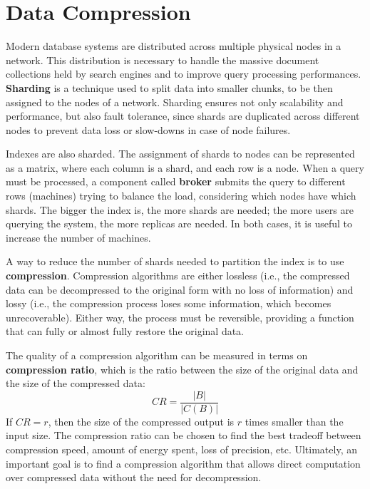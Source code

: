 \chapter{Data Compression}

Modern database systems are distributed across multiple physical nodes in a network. This distribution is necessary to handle the massive document collections held by search engines and to improve query processing performances. \textbf{Sharding} is a technique used to split data into smaller chunks, to be then assigned to the nodes of a network. Sharding ensures not only scalability and performance, but also fault tolerance, since shards are duplicated across different nodes to prevent data loss or slow-downs in case of node failures. 

Indexes are also sharded. The assignment of shards to nodes can be represented as a matrix, where each column is a shard, and each row is a node. When a query must be processed, a component called \textbf{broker} submits the query to different rows (machines) trying to balance the load, considering which nodes have which shards. The bigger the index is, the more shards are needed; the more users are querying the system, the more replicas are needed. In both cases, it is useful to increase the number of machines.

A way to reduce the number of shards needed to partition the index is to use \textbf{compression}. Compression algorithms are either lossless (i.e., the compressed data can be decompressed to the original form with no loss of information) and lossy (i.e., the compression process loses some information, which becomes unrecoverable). Either way, the process must be reversible, providing a function that can fully or almost fully restore the original data.

The quality of a compression algorithm can be measured in terms on \textbf{compression ratio}, which is the ratio between the size of the original data and the size of the compressed data:
\begin{equation*}
    \textit{CR} = \frac{|B|}{|C(B)|}
\end{equation*}
If $\textit{CR} = r$, then the size of the compressed output is $r$ times smaller than the input size. The compression ratio can be chosen to find the best tradeoff between compression speed, amount of energy spent, loss of precision, etc. Ultimately, an important goal is to find a compression algorithm that allows direct computation over compressed data without the need for decompression.

